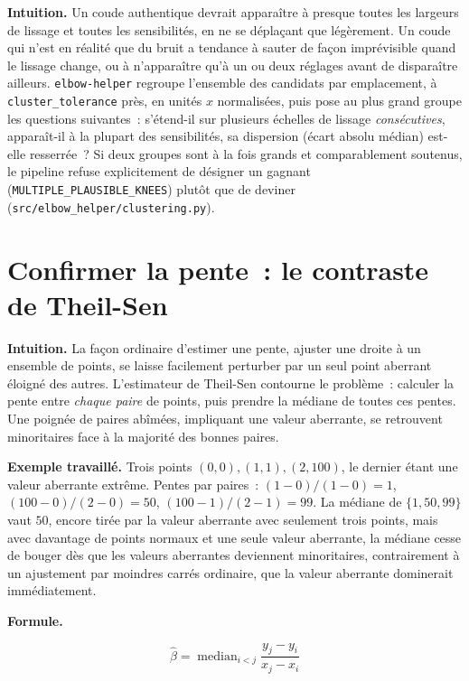 \documentclass[11pt]{article}
\newcommand{\code}[1]{\texttt{#1}}
\begin{document}
\textbf{Intuition.} Un coude authentique devrait apparaître à presque
toutes les largeurs de lissage et toutes les sensibilités, en ne se
déplaçant que légèrement. Un coude qui n'est en réalité que du bruit a
tendance à sauter de façon imprévisible quand le lissage change, ou à
n'apparaître qu'à un ou deux réglages avant de disparaître ailleurs.
\code{elbow-helper} regroupe l'ensemble des candidats par emplacement, à
\code{cluster\_tolerance} près, en unités $x$ normalisées, puis pose au
plus grand groupe les questions suivantes~: s'étend-il sur plusieurs
échelles de lissage \emph{consécutives}, apparaît-il à la plupart des
sensibilités, sa dispersion (écart absolu médian) est-elle resserrée~? Si
deux groupes sont à la fois grands et comparablement soutenus, le pipeline
refuse explicitement de désigner un gagnant
(\code{MULTIPLE\_PLAUSIBLE\_KNEES}) plutôt que de deviner
(\code{src/elbow\_helper/clustering.py}).

\section{Confirmer la pente~: le contraste de Theil-Sen}
\label{sec:theilsen}

\textbf{Intuition.} La façon ordinaire d'estimer une pente, ajuster une
droite à un ensemble de points, se laisse facilement perturber par un seul
point aberrant éloigné des autres. L'estimateur de Theil-Sen contourne le
problème~: calculer la pente entre \emph{chaque paire} de points, puis
prendre la médiane de toutes ces pentes. Une poignée de paires abîmées,
impliquant une valeur aberrante, se retrouvent minoritaires face à la
majorité des bonnes paires.

\textbf{Exemple travaillé.} Trois points $(0,0), (1,1), (2,100)$, le
dernier étant une valeur aberrante extrême. Pentes par paires~:
$(1-0)/(1-0)=1$, $(100-0)/(2-0)=50$, $(100-1)/(2-1)=99$. La médiane de
$\{1, 50, 99\}$ vaut $50$, encore tirée par la valeur aberrante avec
seulement trois points, mais avec davantage de points normaux et une seule
valeur aberrante, la médiane cesse de bouger dès que les valeurs aberrantes
deviennent minoritaires, contrairement à un ajustement par moindres carrés
ordinaire, que la valeur aberrante dominerait immédiatement.

\textbf{Formule.}

\begin{equation}
\hat\beta = \operatorname{median}_{i < j} \frac{y_j - y_i}{x_j - x_i}
\end{equation}
\end{document}
